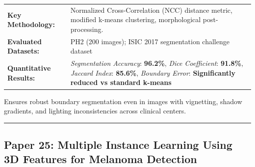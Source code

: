 \documentclass[10pt,a4paper]{article}
\begin{document}
\vspace{4pt}
\begin{tabularx}{\linewidth}{p{3.2cm}X}
\toprule
\textbf{Key Methodology:} & Normalized Cross-Correlation (NCC) distance metric, modified k-means clustering, morphological post-processing. \\
\textbf{Evaluated Datasets:} & PH2 (200 images); ISIC 2017 segmentation challenge dataset \\
\textbf{Quantitative Results:} & \textit{Segmentation Accuracy}: \textbf{96.2\%}, \textit{Dice Coefficient}: \textbf{91.8\%}, \textit{Jaccard Index}: \textbf{85.6\%}, \textit{Boundary Error}: \textbf{Significantly reduced vs standard k-means} \\
\bottomrule
\end{tabularx}
\vspace{4pt}
\begin{tcolorbox}[utilitybox,title=Clinical Utility and Real-World Impact]
Ensures robust boundary segmentation even in images with vignetting, shadow gradients, and lighting inconsistencies across clinical centers.
\end{tcolorbox}
\vspace{12pt}
\hrule
\vspace{12pt}
\subsection*{Paper 25: Multiple Instance Learning Using 3D Features for Melanoma Detection}
\end{document}
